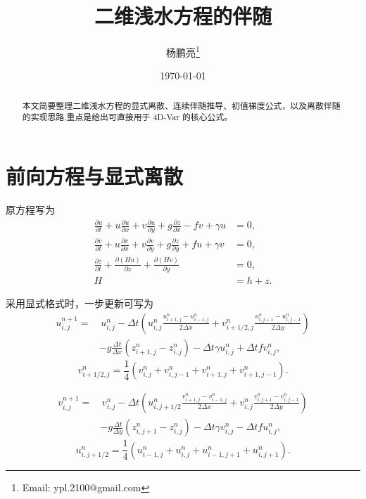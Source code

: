 \documentclass[12pt,a4paper,twoside]{article}
\title{二维浅水方程的伴随}
\author{杨鹏亮\thanks{Email: ypl.2100@gmail.com}}
\date{\today}
\begin{document}
\maketitle

\begin{abstract}
本文简要整理二维浅水方程的显式离散、连续伴随推导、初值梯度公式，以及离散伴随的实现思路,重点是给出可直接用于 4D-Var 的核心公式。
\end{abstract}

\section{前向方程与显式离散}

原方程写为
\begin{align}
    \frac{\partial u}{\partial t}
    + u \frac{\partial u}{\partial x}
    + v \frac{\partial u}{\partial y}
    + g \frac{\partial z}{\partial x}
    - f v + \gamma u &= 0, \\
    \frac{\partial v}{\partial t}
    + u \frac{\partial v}{\partial x}
    + v \frac{\partial v}{\partial y}
    + g \frac{\partial z}{\partial y}
    + f u + \gamma v &= 0, \\
    \frac{\partial z}{\partial t}
    + \frac{\partial (H u)}{\partial x}
    + \frac{\partial (H v)}{\partial y} &= 0, \\
    H &= h + z. \nonumber
\end{align}

采用显式格式时，一步更新可写为
\begin{align}
u_{i,j}^{n+1} = &\, u_{i,j}^{n}
- \Delta t \left(
u_{i,j}^{n} \frac{u_{i+1,j}^{n} - u_{i-1,j}^{n}}{2\Delta x}
+ v_{i+1/2,j}^{n} \frac{u_{i,j+1}^{n} - u_{i,j-1}^{n}}{2\Delta y}
\right) \nonumber \\
&- g \frac{\Delta t}{\Delta x} (z_{i+1,j}^{n} - z_{i,j}^{n})
- \Delta t \gamma u_{i,j}^{n}
+ \Delta t f v_{i,j}^{n},
\end{align}
\[
v_{i+1/2,j}^{n} =
\frac{1}{4}
\left(
v_{i,j}^{n} + v_{i,j-1}^{n} + v_{i+1,j}^{n} + v_{i+1,j-1}^{n}
\right).
\]

\begin{align}
v_{i,j}^{n+1} = &\, v_{i,j}^{n}
- \Delta t \left(
u_{i,j+1/2}^{n} \frac{v_{i+1,j}^{n} - v_{i-1,j}^{n}}{2\Delta x}
+ v_{i,j}^{n} \frac{v_{i,j+1}^{n} - v_{i,j-1}^{n}}{2\Delta y}
\right) \nonumber \\
&- g \frac{\Delta t}{\Delta y} (z_{i,j+1}^{n} - z_{i,j}^{n})
- \Delta t \gamma v_{i,j}^{n}
- \Delta t f u_{i,j}^{n},
\end{align}
\[
u_{i,j+1/2}^{n} =
\frac{1}{4}
\left(
u_{i-1,j}^{n} + u_{i,j}^{n} + u_{i-1,j+1}^{n} + u_{i,j+1}^{n}
\right).
\]
\end{document}
